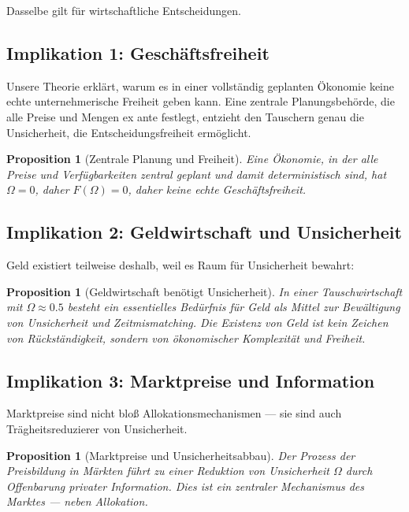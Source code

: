 \documentclass[a4paper, 12pt, twoside, openright]{report}
\newtheorem{proposition}[theorem]{Proposition}
\theoremstyle{definition}
\theoremstyle{definition}
\begin{document}
Dasselbe gilt für wirtschaftliche Entscheidungen.

\subsection{Implikation 1: Geschäftsfreiheit}

Unsere Theorie erklärt, warum es in einer vollständig geplanten Ökonomie keine echte unternehmerische Freiheit geben kann. Eine zentrale Planungsbehörde, die alle Preise und Mengen ex ante festlegt, entzieht den Tauschern genau die Unsicherheit, die Entscheidungsfreiheit ermöglicht.

\begin{proposition}[Zentrale Planung und Freiheit]
    Eine Ökonomie, in der alle Preise und Verfügbarkeiten zentral geplant und damit deterministisch sind, hat $\Omega = 0$, daher $F(\Omega) = 0$, daher keine echte Geschäftsfreiheit.
\end{proposition}

\subsection{Implikation 2: Geldwirtschaft und Unsicherheit}

Geld existiert teilweise deshalb, weil es Raum für Unsicherheit bewahrt:

\begin{proposition}[Geldwirtschaft benötigt Unsicherheit]
    In einer Tauschwirtschaft mit $\Omega \approx 0.5$ besteht ein essentielles Bedürfnis für Geld als Mittel zur Bewältigung von Unsicherheit und Zeitmismatching. Die Existenz von Geld ist kein Zeichen von Rückständigkeit, sondern von ökonomischer Komplexität und Freiheit.
\end{proposition}

\subsection{Implikation 3: Marktpreise und Information}

Marktpreise sind nicht bloß Allokationsmechanismen --- sie sind auch Trägheitsreduzierer von Unsicherheit.

\begin{proposition}[Marktpreise und Unsicherheitsabbau]
    Der Prozess der Preisbildung in Märkten führt zu einer Reduktion von Unsicherheit $\Omega$ durch Offenbarung privater Information. Dies ist ein zentraler Mechanismus des Marktes --- neben Allokation.
\end{proposition}
\end{document}
